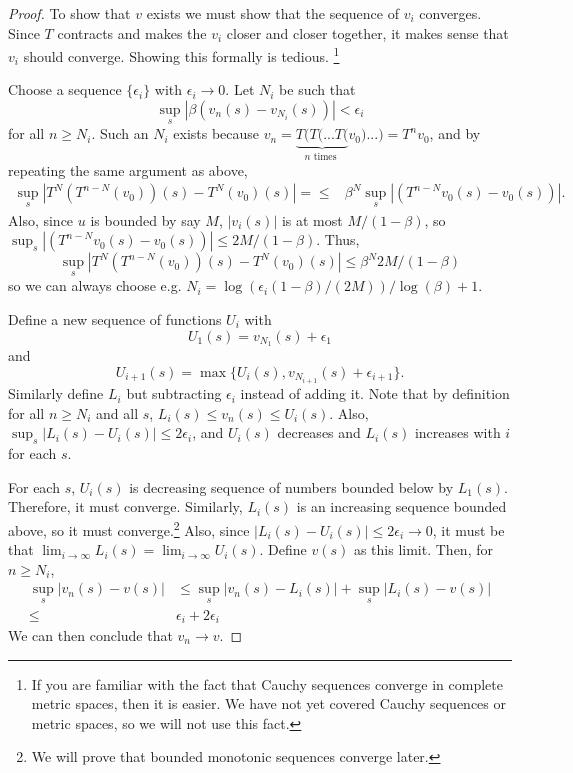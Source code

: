 \begin{proof}
  To show that $v$ exists we must show that the sequence of $v_i$
  converges.  Since $T$ contracts and makes the $v_i$ closer and
  closer together, it makes sense that $v_i$ should converge. Showing
  this formally is tedious.  \footnote{If you are familiar with the fact
    that Cauchy sequences converge in complete metric spaces, then it
    is easier. We have not yet covered Cauchy sequences or metric
    spaces, so we will not use this fact.}
  
  Choose a sequence $\{\epsilon_i\}$ with $\epsilon_i \to 0$. Let
  $N_i$ be such that 
  \[ \sup_s \left\vert \beta(v_{n}(s) -v_{N_i}(s))  \right \vert <
  \epsilon_i \]
  for all $n \geq N_i$. Such an $N_i$ exists because $v_n =
  \underbrace{T(T (
    ... T(}_{n \text{ times }} v_0) ... ) = T^n v_0$, and by repeating
  the same argument as above,
  \begin{align*}
    \sup_{s} \left\vert T^N (T^{n-N}( v_0))(s)- T^N(v_0) (s) \right\vert = 
    \leq & \beta^N \sup_s \left\vert (T^{n-N}v_0(s) -v_0(s)) \right\vert.
  \end{align*}
  Also, since $u$ is bounded by say $M$, $|v_i(s)|$ is at most
  $M/(1-\beta)$, so $\sup_s \left\vert (T^{n-N}v_0(s) -v_0(s))
  \right\vert \leq 2 M /(1-\beta)$. Thus,
  \[ 
  \sup_{s} \left\vert T^N (T^{n-N}( v_0))(s)- T^N(v_0) (s) \right\vert
  \leq \beta^N 2M/(1-\beta)  
  \]
  so we can always choose e.g. $N_i = \log(\epsilon_i
  (1-\beta)/(2M))/\log(\beta) + 1$.
  
  Define a new sequence of functions $U_i$ with 
  \[ U_1(s) = v_{N_1}(s) + \epsilon_1 \] and 
  \[ U_{i+1}(s) = \max\{
  U_{i}(s), v_{N_{i+1}}(s) + \epsilon_{i+1} \}.\] Similarly define $L_i$
  but subtracting $\epsilon_i$ instead of adding it. 
  Note that by definition for all $n \geq N_i$ and all
  $s$, $L_i(s) \leq v_n(s) \leq U_i(s)$. Also, $\sup_{s} |L_i(s) -
  U_i(s) | \leq 2\epsilon_i$, and $U_i(s)$ decreases and $L_i(s)$
  increases with $i$ for each $s$. 

  For each $s$, $U_i(s)$ is decreasing sequence of numbers bounded
  below by $L_1(s)$. Therefore, it must converge. Similarly, $L_i(s)$
  is an increasing sequence bounded above, so it must
  converge.\footnote{We will prove that bounded monotonic sequences
    converge later.} Also, since $|L_i(s) - U_i(s) | \leq 2\epsilon_i
  \to 0$, it must be that $\lim_{i\to \infty} L_i(s) = \lim_{i\to
    \infty } U_i(s)$. Define $v(s)$ as this limit. Then, for $n \geq N_i$,
  \begin{align*}
    \sup_{s} \left\vert v_n(s) - v(s) \right\vert & 
    \leq \sup_s \left\vert v_n(s) - L_i(s) \right\vert + \sup_s
    \left\vert L_i(s) - v(s) \right\vert \\
    \leq & \epsilon_i + 2\epsilon_i
  \end{align*}
  We can then conclude that $v_n \to v$.   
\end{proof}   
 

